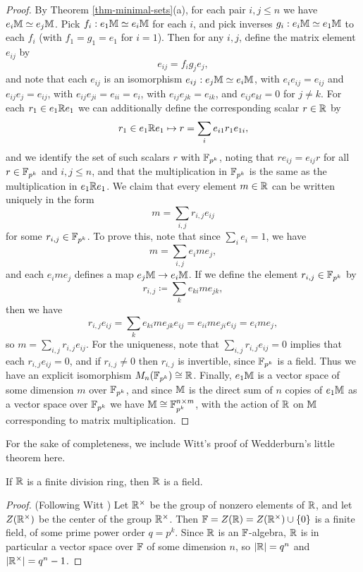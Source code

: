 \begin{appendices}
\begin{proof}
By Theorem \ref{thm-minimal-sets}(a), for each pair $i,j \le n$ we have $e_i\mathbb{M} \simeq e_j\mathbb{M}$. Pick $f_i : e_1\mathbb{M} \simeq e_i\mathbb{M}$ for each $i$, and pick inverses $g_i : e_i\mathbb{M} \simeq e_1\mathbb{M}$ to each $f_i$ (with $f_1 = g_1 = e_1$ for $i = 1$). Then for any $i,j$, define the matrix element $e_{ij}$ by
\[
e_{ij} = f_ig_je_j,
\]
and note that each $e_{ij}$ is an isomorphism $e_{ij} : e_j\mathbb{M} \simeq e_i\mathbb{M}$, with $e_ie_{ij} = e_{ij}$ and $e_{ij}e_j = e_{ij}$, with $e_{ij}e_{ji} = e_{ii} = e_i$, with $e_{ij}e_{jk} = e_{ik}$, and $e_{ij}e_{kl} = 0$ for $j \ne k$.
For each $r_1 \in e_1\mathbb{R} e_1$ we can additionally define the corresponding scalar $r \in \mathbb{R}$ by
\[
r_1 \in e_1\mathbb{R} e_1 \mapsto r = \sum_i e_{i1}r_1e_{1i},
\]
and we identify the set of such scalars $r$ with $\mathbb{F}_{p^k}$, noting that $re_{ij} = e_{ij}r$ for all $r \in \mathbb{F}_{p^k}$ and $i,j \le n$, and that the multiplication in $\mathbb{F}_{p^k}$ is the same as the multiplication in $e_1\mathbb{R} e_1$. We claim that every element $m \in \mathbb{R}$ can be written uniquely in the form
\[
m = \sum_{i,j} r_{i,j}e_{ij}
\]
for some $r_{i,j} \in \mathbb{F}_{p^k}$. To prove this, note that since $\sum_i e_i = 1$, we have
\[
m = \sum_{i,j} e_ime_j,
\]
and each $e_ime_j$ defines a map $e_j\mathbb{M} \rightarrow e_i\mathbb{M}$. If we define the element $r_{i,j} \in \mathbb{F}_{p^k}$ by
\[
r_{i,j} \coloneqq \sum_k e_{ki}me_{jk},
\]
then we have
\[
r_{i,j}e_{ij} = \sum_k e_{ki}me_{jk}e_{ij} = e_{ii}me_{ji}e_{ij} = e_ime_j,
\]
so $m = \sum_{i,j} r_{i,j}e_{ij}$. For the uniqueness, note that $\sum_{i,j} r_{i,j}e_{ij} = 0$ implies that each $r_{i,j}e_{ij} = 0$, and if $r_{i,j} \ne 0$ then $r_{i,j}$ is invertible, since $\mathbb{F}_{p^k}$ is a field. Thus we have an explicit isomorphism $M_n(\mathbb{F}_{p^k}) \cong \mathbb{R}$. Finally, $e_1\mathbb{M}$ is a vector space of some dimension $m$ over $\mathbb{F}_{p^k}$, and since $\mathbb{M}$ is the direct sum of $n$ copies of $e_1\mathbb{M}$ as a vector space over $\mathbb{F}_{p^k}$ we have $\mathbb{M} \cong \mathbb{F}_{p^k}^{n\times m}$, with the action of $\mathbb{R}$ on $\mathbb{M}$ corresponding to matrix multiplication.
\end{proof}

For the sake of completeness, we include Witt's proof of Wedderburn's little theorem here.

\begin{thm}\label{thm-wedderburn-little} If $\mathbb{R}$ is a finite division ring, then $\mathbb{R}$ is a field.
\end{thm}
\begin{proof} (Following Witt \cite{witt-wedderburn-little}) Let $\mathbb{R}^\times$ be the group of nonzero elements of $\mathbb{R}$, and let $Z(\mathbb{R}^\times)$ be the center of the group $\mathbb{R}^\times$. Then $\mathbb{F} = Z(\mathbb{R}) = Z(\mathbb{R}^\times) \cup \{0\}$ is a finite field, of some prime power order $q = p^k$. Since $\mathbb{R}$ is an $\mathbb{F}$-algebra, $\mathbb{R}$ is in particular a vector space over $\mathbb{F}$ of some dimension $n$, so $|\mathbb{R}| = q^n$ and $|\mathbb{R}^\times| = q^n-1$.


\end{proof}
\end{appendices}

